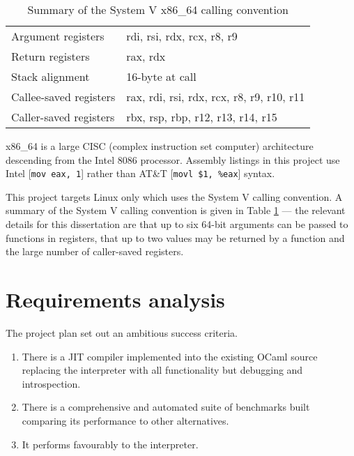 \begin{table}[h]
    \centering

    \begin{tabular}{ll}\toprule
        Argument registers     & rdi, rsi, rdx, rcx, r8, r9                \\
        Return registers       & rax, rdx                                  \\
        Stack alignment        & 16-byte at call                           \\
        Callee-saved registers & rax, rdi, rsi, rdx, rcx, r8, r9, r10, r11 \\
        Caller-saved registers & rbx, rsp, rbp, r12, r13, r14, r15         \\
        \bottomrule
    \end{tabular}

    \caption{Summary of the System V x86\_64 calling convention}
    \label{table:systemv}

\end{table}

x86\_64 is a large CISC (complex instruction set computer) architecture descending from the Intel
8086 processor.
Assembly listings in this project use Intel
    [\texttt{mov eax, 1}] rather than AT\&T [\texttt{movl
    \$1, \%eax}] syntax.

This project targets Linux only which uses the System V calling convention.  A summary of the
System V calling convention is given in Table \ref{table:systemv} --- the relevant details for this
dissertation are that up to six 64-bit arguments can be passed to functions in registers, that up
to two values may be returned by a function and the large number of caller-saved registers.

\section{Requirements analysis}

The project plan set out an ambitious success criteria.

\begin{enumerate}
    \item There is a JIT compiler implemented into the existing OCaml source
          replacing the interpreter with all functionality but debugging
          and introspection.
    \item There is a comprehensive and automated suite of benchmarks built
          comparing its performance to other alternatives.
    \item It performs favourably to the interpreter.
\end{enumerate}

